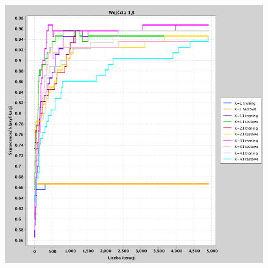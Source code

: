 \documentclass[a4paper, portrait,11pt]{article}
\begin{document}
\begin{figure}[!htb]
\begin{minipage}{0.33\textwidth}
    \caption{\label{fig:41_2_1,2}}
  \end{minipage}
  \begin{minipage}{0.33\textwidth}
    \centering
    \includegraphics[width=1\linewidth]{../data/classification4/1/2_1,3.png}
    \caption{\label{fig:41_2_1,3}}
  \end{minipage}\hfill
\end{figure}
\end{document}
